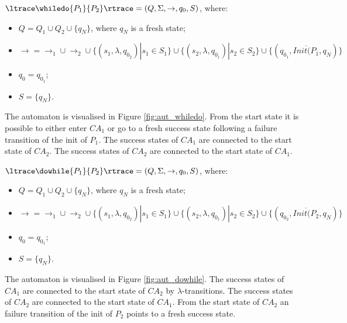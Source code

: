 \begin{definition}
$\ltrace \whiledo{P_1}{P_2} \rtrace  = ( Q, \Sigma, \rightarrow, q_0, S)$, where:
\begin{itemize}
\item $Q = Q_{1} \cup Q_{2} \cup \{q_N\}$, where $q_N$ is a fresh state;
\item $\rightarrow = \rightarrow_{1} \cup \rightarrow_{2} \cup \{(s_1,\lambda,q_{0_2})|s_1 \in S_1\} \cup \{(s_2,\lambda,q_{0_1})| s_2 \in S_2\} \cup \{(q_{0_1},\overline{Init(P_1},q_N)\}$
\item $q_0 = q_{0_1}$;
\item $S = \{q_N\}$.
\end{itemize}
\end{definition}

The automaton is visualised in Figure \ref{fig:aut_whiledo}. From the start state it is possible to either enter $CA_1$ or go to a fresh success state following a failure transition of the init of $P_1$. The success states of $CA_1$ are connected to the start state of $CA_2$. The success states of $CA_2$ are connected to the start state of $CA_1$.


\begin{definition}
$\ltrace \dowhile{P_1}{P_2} \rtrace  = ( Q, \Sigma, \rightarrow, q_0, S)$, where:
\begin{itemize}
\item $Q = Q_{1} \cup Q_{2} \cup \{q_N\}$, where $q_N$ is a fresh state;
\item $\rightarrow = \rightarrow_{1} \cup \rightarrow_{2} \cup 
\{(s_1,\lambda,q_{0_2})|s_1 \in S_1\} 
\cup 
\{(s_2,\lambda,q_{0_1})| s_2 \in S_2\} 
\cup 
\{(q_{0_2},\overline{Init(P_2},q_N)\}$
\item $q_0 = q_{0_1}$;
\item $S = \{q_N\}$.
\end{itemize}
\end{definition}

The automaton is visualised in Figure \ref{fig:aut_dowhile}. The success states of $CA_1$ are connected to the start state of $CA_2$ by $\lambda$-transitions. The success states of $CA_2$ are connected to the start state of $CA_1$. From the start state of $CA_2$ an failure transition of the init of $P_2$ points to a fresh success state.

